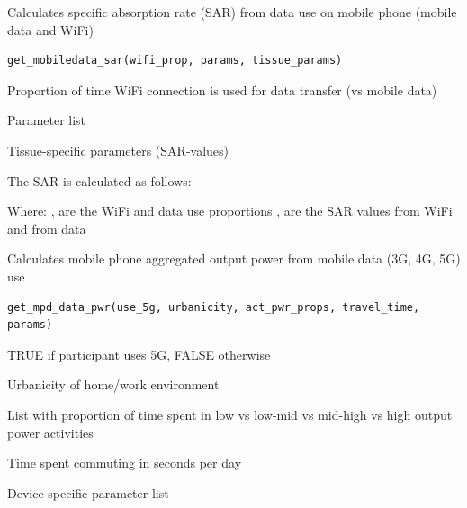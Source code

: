 \documentclass[a4paper]{book}
\begin{document}
\begin{Description}
Calculates specific absorption rate (SAR) from data use on mobile phone (mobile data and WiFi)
\end{Description}
%
\begin{Usage}
\begin{verbatim}
get_mobiledata_sar(wifi_prop, params, tissue_params)
\end{verbatim}
\end{Usage}
%
\begin{Arguments}
\begin{ldescription}
\item[\code{wifi\_prop}] Proportion of time WiFi connection is used for data transfer (vs mobile data)

\item[\code{params}] Parameter list

\item[\code{tissue\_params}] Tissue-specific parameters (SAR-values)
\end{ldescription}
\end{Arguments}
%
\begin{Details}
The SAR is calculated as follows:

Where:
,  are the WiFi and data use proportions
,  are the SAR values from WiFi and from data
\end{Details}
%
\begin{Description}
Calculates mobile phone aggregated output power from mobile data (3G, 4G, 5G) use
\end{Description}
%
\begin{Usage}
\begin{verbatim}
get_mpd_data_pwr(use_5g, urbanicity, act_pwr_props, travel_time, params)
\end{verbatim}
\end{Usage}
%
\begin{Arguments}
\begin{ldescription}
\item[\code{use\_5g}] TRUE if participant uses 5G, FALSE otherwise

\item[\code{urbanicity}] Urbanicity of home/work environment

\item[\code{act\_pwr\_props}] List with proportion of time spent in low vs low-mid vs mid-high vs high output power activities

\item[\code{travel\_time}] Time spent commuting in seconds per day

\item[\code{params}] Device-specific parameter list
\end{ldescription}
\end{Arguments}
\end{document}
